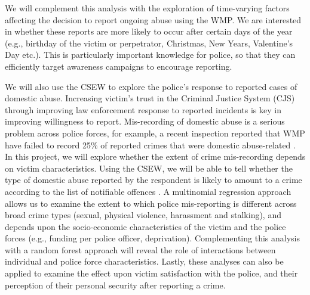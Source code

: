\documentclass[11pt, a4paper]{article}
\begin{document}
We will complement this analysis with the exploration of time-varying factors affecting the decision to report ongoing abuse using the WMP. We are interested in whether these reports are more likely to occur after certain days of the year (e.g., birthday of the victim or perpetrator, Christmas, New Years, Valentine's Day etc.). This is particularly important knowledge for police, so that they can efficiently target awareness campaigns to encourage reporting.
 
 
%
%
%
%


We will also use the CSEW to explore the police's response to reported cases of domestic abuse. Increasing victim's trust in the Criminal Justice System (CJS) through improving law enforcement response to reported incidents is key in improving willingness to report. Mis-recording of domestic abuse is a serious problem across police forces, for example, a recent inspection reported that WMP have failed to record 25\% of reported crimes that were domestic abuse-related \cite{HerMajestysInspectorateofConstabularyandFires&RescueServices2019}. In this project, we will explore whether the extent of crime mis-recording depends on victim characteristics. Using the CSEW, we will be able to tell whether the type of domestic abuse reported by the respondent is likely to amount to a crime according to the list of notifiable offences \cite{countingrules}. A multinomial regression approach allows us to examine the extent to which police mis-reporting is different across broad crime types (sexual, physical violence, harassment and stalking), and depends upon the socio-economic characteristics of the victim and the police forces (e.g., funding per police officer, deprivation). Complementing this analysis with a random forest approach will reveal the role of interactions between individual and police force characteristics. Lastly, these analyses can also be applied to examine the effect upon victim satisfaction with the police, and their perception of their personal security after reporting a crime.
\end{document}
